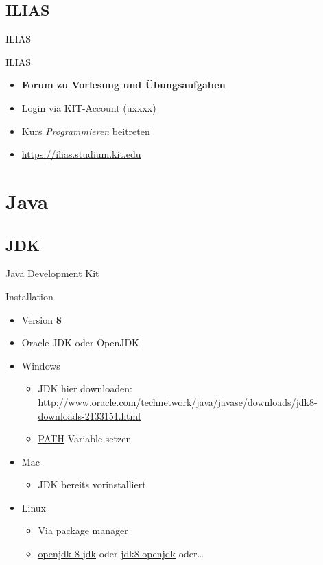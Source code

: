 \documentclass[18pt]{beamer}
\begin{document}
\subsection{ILIAS}

\begin{frame}{ILIAS}
    \begin{block}{ILIAS}
        \begin{itemize}
            \item \textbf{Forum zu Vorlesung und Übungsaufgaben}
            \item Login via KIT-Account (uxxxx)
            \item Kurs \textit{Programmieren} beitreten
            \item \url{https://ilias.studium.kit.edu}
        \end{itemize}
    \end{block}
\end{frame}


\section{Java}

\subsection{JDK}

\begin{frame}{Java Development Kit}
    \begin{block}{Installation}
        \begin{itemize}
            \item Version \textbf{8}
            \item Oracle JDK oder OpenJDK
            \pause
            \item Windows
            \begin{itemize}
                \item JDK hier downloaden:\\
                \url{http://www.oracle.com/technetwork/java/javase/downloads/jdk8-downloads-2133151.html}
                \item \url{PATH} Variable setzen
            \end{itemize}
            \item Mac
            \begin{itemize}
                \item JDK bereits vorinstalliert
            \end{itemize}
            \item Linux
            \begin{itemize}
                \item Via package manager
                \item \url{openjdk-8-jdk} oder \url{jdk8-openjdk} oder\dots
            \end{itemize}
        \end{itemize}
    \end{block}
\end{frame}
\end{document}
